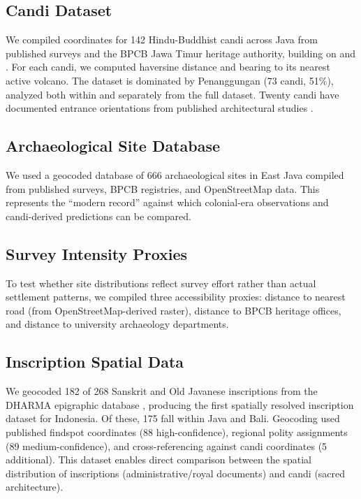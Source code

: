 \documentclass[12pt,a4paper]{article}
\begin{document}
\subsection{Candi Dataset}

We compiled coordinates for 142 Hindu-Buddhist candi across Java from published surveys and the BPCB Jawa Timur heritage authority, building on \citet{dumarcay1993} and \citet{soekmono1995}. For each candi, we computed haversine distance and bearing to its nearest active volcano. The dataset is dominated by Penanggungan (73 candi, 51\%), analyzed both within and separately from the full dataset. Twenty candi have documented entrance orientations from published architectural studies \citep{dumarcay1993}.

\subsection{Archaeological Site Database}

We used a geocoded database of 666 archaeological sites in East Java compiled from published surveys, BPCB registries, and OpenStreetMap data. This represents the ``modern record'' against which colonial-era observations and candi-derived predictions can be compared.

\subsection{Survey Intensity Proxies}

To test whether site distributions reflect survey effort rather than actual settlement patterns, we compiled three accessibility proxies: distance to nearest road (from OpenStreetMap-derived raster), distance to BPCB heritage offices, and distance to university archaeology departments.

\subsection{Inscription Spatial Data}

We geocoded 182 of 268 Sanskrit and Old Javanese inscriptions from the DHARMA epigraphic database \citep{dharma2024}, producing the first spatially resolved inscription dataset for Indonesia. Of these, 175 fall within Java and Bali. Geocoding used published findspot coordinates (88 high-confidence), regional polity assignments (89 medium-confidence), and cross-referencing against candi coordinates (5 additional). This dataset enables direct comparison between the spatial distribution of inscriptions (administrative/royal documents) and candi (sacred architecture).
\end{document}

